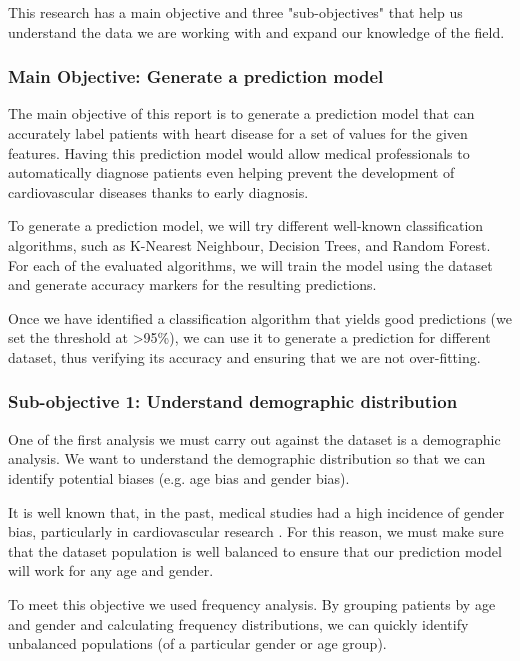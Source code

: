 This research has a main objective and three "sub-objectives" that help us understand the data we are working with
and expand our knowledge of the field.

\subsubsection{Main Objective: Generate a prediction model}

The main objective of this report is to generate a prediction model that can accurately label patients with heart disease
for a set of values for the given features. Having this prediction model would allow medical professionals to automatically
diagnose patients even helping prevent the development of cardiovascular diseases thanks to early diagnosis.

To generate a prediction model, we will try different well-known classification algorithms, such as K-Nearest Neighbour, 
Decision Trees, and Random Forest. For each of the evaluated algorithms, we will train the model using the dataset and
generate accuracy markers for the resulting predictions.

Once we have identified a classification algorithm that yields good predictions (we set the threshold at >95\%), we can
use it to generate a prediction for different dataset, thus verifying its accuracy and ensuring that we are not over-fitting.

\subsubsection{Sub-objective 1: Understand demographic distribution}

One of the first analysis we must carry out against the dataset is a demographic analysis. We want to understand
the demographic distribution so that we can identify potential biases (e.g. age bias and gender bias).

It is well known that, in the past, medical studies had a high incidence of gender bias, particularly in cardiovascular
research \cite{GenderBiasCardiovascularResearch}. For this reason, we must make sure that the dataset population
is well balanced to ensure that our prediction model will work for any age and gender.

To meet this objective we used frequency analysis. By grouping patients by age and gender and calculating frequency
distributions, we can quickly identify unbalanced populations (of a particular gender or age group).

